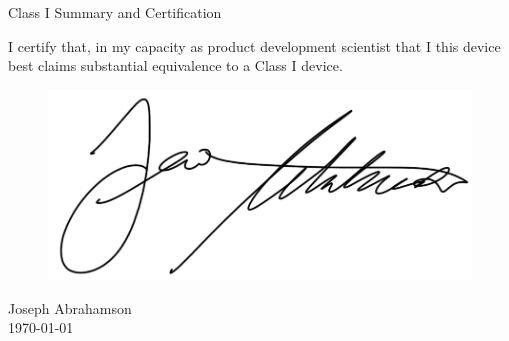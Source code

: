 \newpage
{}
\singlespacing
\begin{center}
  \large{Class I Summary and Certification}
\end{center}

\onehalfspacing

I certify that, in my capacity as product development scientist that I
this device best claims substantial equivalence to a Class I device.

\begin{figure}[H]
  \includegraphics[width=0.35\linewidth]{imgs/ja-sig}
\end{figure}

\noindent Joseph Abrahamson \\
\today

